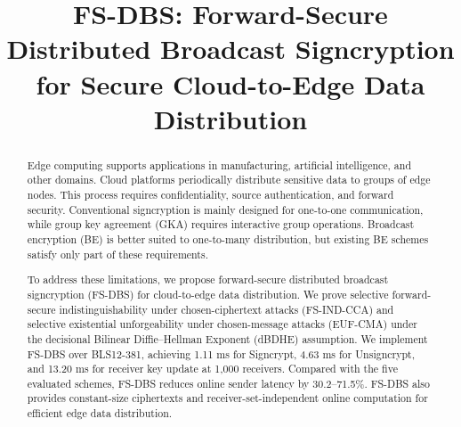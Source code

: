 \documentclass[sigconf,anonymous]{acmart}
\theoremstyle{definition}
\theoremstyle{definition}
\theoremstyle{definition}
\theoremstyle{definition}
\theoremstyle{definition}
\theoremstyle{definition}
\theoremstyle{definition}
\theoremstyle{definition}
\theoremstyle{definition}
\begin{document}
\title{FS-DBS: Forward-Secure Distributed Broadcast Signcryption for Secure Cloud-to-Edge Data Distribution}




\begin{abstract}
Edge computing supports applications in manufacturing, artificial intelligence, and other domains. Cloud platforms periodically distribute sensitive data to groups of edge nodes. This process requires confidentiality, source authentication, and forward security. Conventional signcryption is mainly designed for one-to-one communication, while group key agreement (GKA) requires interactive group operations. Broadcast encryption (BE) is better suited to one-to-many distribution, but existing BE schemes satisfy only part of these requirements.

To address these limitations, we propose forward-secure distributed broadcast signcryption (FS-DBS) for cloud-to-edge data distribution. We prove selective forward-secure indistinguishability under chosen-ciphertext attacks (FS-IND-CCA) and selective existential unforgeability under chosen-message attacks (EUF-CMA) under the decisional Bilinear Diffie--Hellman Exponent (dBDHE) assumption. We implement FS-DBS over BLS12-381, achieving 1.11 ms for Signcrypt, 4.63 ms for Unsigncrypt, and 13.20 ms for receiver key update at 1,000 receivers. Compared with the five evaluated schemes, FS-DBS reduces online sender latency by 30.2--71.5\%. FS-DBS also provides constant-size ciphertexts and receiver-set-independent online computation for efficient edge data distribution.

\end{abstract}

\end{document}
